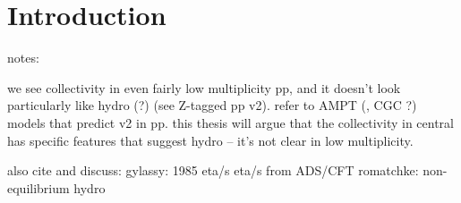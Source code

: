 \chapter{Introduction}
\label{ch:intro}

 notes:

 we see collectivity in even fairly low multiplicity pp, and it doesn't look particularly like hydro (?) (see Z-tagged pp v2). refer to AMPT (, CGC ?) models that predict v2 in pp. this thesis will argue that the collectivity in central \pPb has specific features that suggest hydro -- it's not clear in low multiplicity.

 also cite and discuss:
 gylassy: 1985 eta/s
 eta/s from ADS/CFT
 romatchke: non-equilibrium hydro
